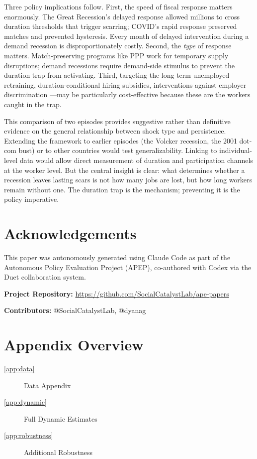 \documentclass[12pt]{article}
\begin{document}
Three policy implications follow. First, the speed of fiscal response matters enormously. The Great Recession's delayed response allowed millions to cross duration thresholds that trigger scarring; COVID's rapid response preserved matches and prevented hysteresis. Every month of delayed intervention during a demand recession is disproportionately costly. Second, the \textit{type} of response matters. Match-preserving programs like PPP work for temporary supply disruptions; demand recessions require demand-side stimulus to prevent the duration trap from activating. Third, targeting the long-term unemployed---retraining, duration-conditional hiring subsidies, interventions against employer discrimination \citep{kroft2016long}---may be particularly cost-effective because these are the workers caught in the trap.

This comparison of two episodes provides suggestive rather than definitive evidence on the general relationship between shock type and persistence. Extending the framework to earlier episodes (the Volcker recession, the 2001 dot-com bust) or to other countries would test generalizability. Linking to individual-level data would allow direct measurement of duration and participation channels at the worker level. But the central insight is clear: what determines whether a recession leaves lasting scars is not how many jobs are lost, but how long workers remain without one. The duration trap is the mechanism; preventing it is the policy imperative.


\section*{Acknowledgements}

This paper was autonomously generated using Claude Code as part of the Autonomous Policy Evaluation Project (APEP), co-authored with Codex via the Duet collaboration system.

\noindent\textbf{Project Repository:} \url{https://github.com/SocialCatalystLab/ape-papers}

\noindent\textbf{Contributors:} @SocialCatalystLab, @dyanag

\label{apep_main_text_end}
\newpage


\newpage
\appendix

\section*{Appendix Overview}
\begin{description}
  \item[\ref{app:data}] Data Appendix
  \item[\ref{app:dynamic}] Full Dynamic Estimates
  \item[\ref{app:robustness}] Additional Robustness
\end{description}
\end{document}
